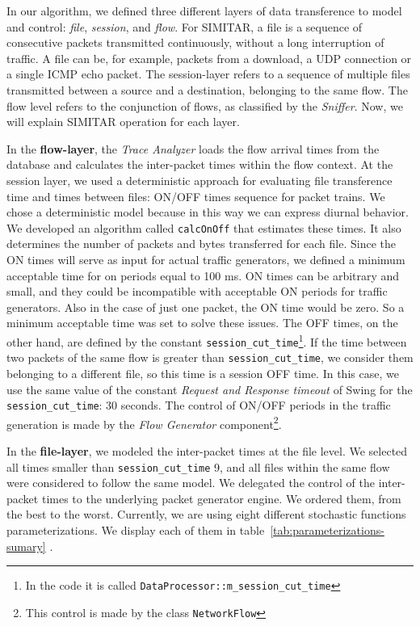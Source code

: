 In our algorithm, we defined three different layers of data transference to model and control: \textit{file}, \textit{session}, and \textit{flow}. For SIMITAR, a file is a sequence of consecutive packets transmitted continuously, without a long interruption of traffic. A file can be, for example, packets from a download, a UDP connection or a single \acrfull{ICMP} echo packet. The session-layer refers to a sequence of multiple files transmitted between a source and a destination, belonging to the same flow. The flow level refers to the conjunction of flows, as classified by the \textit{Sniffer}. Now, we will explain SIMITAR operation for each layer.

In the \textbf{flow-layer}, the \textit{Trace Analyzer}  loads the flow arrival times from the database and calculates the inter-packet times within the flow context. At the session layer, we used a deterministic approach for evaluating file transference time and times between files: ON/OFF times sequence for packet trains. We chose a deterministic model because in this way we can express diurnal behavior. We developed an algorithm called \texttt{calcOnOff} that estimates these times. It also determines the number of packets and bytes transferred for each file. Since the ON times will serve as input for actual traffic generators, we defined a minimum acceptable time for on periods equal to 100 ms. ON times can be arbitrary and small, and they could be incompatible with acceptable ON periods for traffic generators. Also in the case of just one packet, the ON time would be zero. So  a minimum acceptable time was set to solve these issues. The OFF times, on the other hand, are defined by the constant \texttt{session\_cut\_time}\footnote{In the code it is called \texttt{DataProcessor::m\_session\_cut\_time} }. If the time between two packets of the same flow is greater than \texttt{session\_cut\_time}, we consider them belonging to a different file, so this time is a session OFF time. In this case, we use the same value of the constant \textit{Request and Response timeout} of Swing\cite{swing-paper} for the \texttt{session\_cut\_time}: 30 seconds. The control of ON/OFF periods in the traffic generation is made by the \textit{Flow Generator} component\footnote{This control is made by the class \texttt{NetworkFlow}}.

In the \textbf{file-layer}, we modeled the inter-packet times at the file level. We selected all times smaller than \texttt{session\_cut\_time} 9, and all files within the same flow were considered to follow the same model. We delegated the control of the inter-packet times to the underlying packet generator engine. We ordered them, from the best to the worst. Currently, we are using eight different stochastic functions parameterizations. We display each of them in table~\ref{tab:parameterizations-sumary} .

